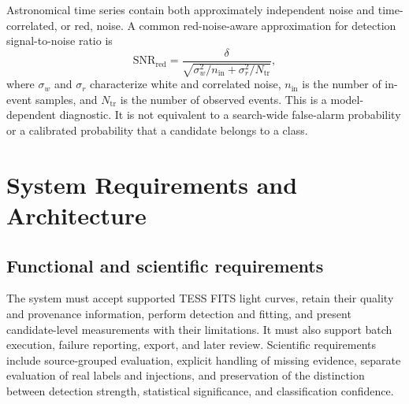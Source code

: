 \documentclass[11pt,a4paper]{article}
\begin{document}
Astronomical time series contain both approximately independent noise and time-correlated, or red, noise. A common red-noise-aware approximation for detection signal-to-noise ratio is \cite{pont}
\begin{equation}
\mathrm{SNR}_{\mathrm{red}}=\frac{\delta}{\sqrt{\sigma_w^2/n_{\mathrm{in}}+\sigma_r^2/N_{\mathrm{tr}}}},
\end{equation}
where $\sigma_w$ and $\sigma_r$ characterize white and correlated noise, $n_{\mathrm{in}}$ is the number of in-event samples, and $N_{\mathrm{tr}}$ is the number of observed events. This is a model-dependent diagnostic. It is not equivalent to a search-wide false-alarm probability or a calibrated probability that a candidate belongs to a class.

\section{System Requirements and Architecture}
\subsection{Functional and scientific requirements}
The system must accept supported TESS FITS light curves, retain their quality and provenance information, perform detection and fitting, and present candidate-level measurements with their limitations. It must also support batch execution, failure reporting, export, and later review. Scientific requirements include source-grouped evaluation, explicit handling of missing evidence, separate evaluation of real labels and injections, and preservation of the distinction between detection strength, statistical significance, and classification confidence.
\end{document}
